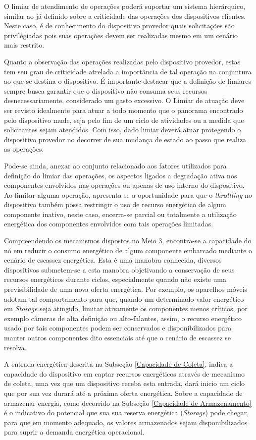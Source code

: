 O limiar de atendimento de operações poderá suportar um sistema hierárquico, similar ao já definido sobre a criticidade das operações dos dispositivos clientes. Neste caso, é de conhecimento do dispositivo provedor quais solicitações são privilégiadas pois suas operações devem ser realizadas mesmo em um cenário mais restrito.

Quanto a observação das operações realizadas pelo dispositivo provedor, estas tem seu grau de criticidade atrelada a importância de tal operação na conjuntura ao que se destina o dispositivo. É importante destacar que a definição de limiares sempre busca garantir que o dispositivo não consuma seus recursos desnecessariamente, considerado um gasto excessivo. O Limiar de atuação deve ser revisto idealmente para atuar a todo momento que o panorama encontrado pelo dispositivo mude, seja pelo fim de um ciclo de atividades ou a medida que solicitantes sejam atendidos. Com isso, dado limiar deverá atuar protegendo o dispositivo provedor no decorrer de sua mudança de estado ao passo que realiza as operações. 

Pode-se ainda, anexar ao conjunto relacionado aos fatores utilizados para definição do limiar das operações, os aspectos ligados a degradação ativa nos componentes envolvidos nas operações  ou apenas de uso interno do dispositivo. Ao limitar alguma operação, apresenta-se a oportunidade para que o \textit{throttling} no dispositivo também possa restringir o uso de recurso energético de algum componente inativo, neste caso, encerra-se parcial ou totalmente a utilização energética dos componentes envolvidos com tais operações limitadas. 

Compreendendo os mecanismos dispostos no Meio 3, encontra-se a capacidade do nó em reduzir o consumo energético de algum componente embarcado mediante o cenário de escassez energética. Esta é uma manobra conhecida, diversos dispositivos submetem-se a esta manobra objetivando a conservação de seus recursos energéticos durante ciclos, especialmente quando não existe uma previsibilidade de uma nova oferta energética. Por exemplo, os aparelhos móveis adotam tal comportamento para que, quando um determinado valor energético em \textit{Storage} seja atingido, limitar ativamente os componentes menos críticos, por exemplo câmeras de alta definição ou alto-falantes, assim, o recurso energético usado por tais componentes podem ser conservados e disponibilizados para manter outros componentes dito essenciais até que o cenário de escassez se resolva. 

A entrada energética descrita na Subseção \ref{Capacidade de Coleta}, indica a capacidade do dispositivo em captar recursos energéticos através de mecanismo de coleta, uma vez que um dispositivo receba esta entrada, dará inicio um ciclo que por sua vez durará até a próxima oferta energética. Sobre a capacidade de armazenar energia, como decorrido na Subseção \ref{Capacidade de Armazenamento} é o indicativo do potencial que sua sua reserva energética (\textit{Storage}) pode chegar, para que em momento adequado, os valores armazenados sejam disponibilizados para suprir a demanda energética operacional.

